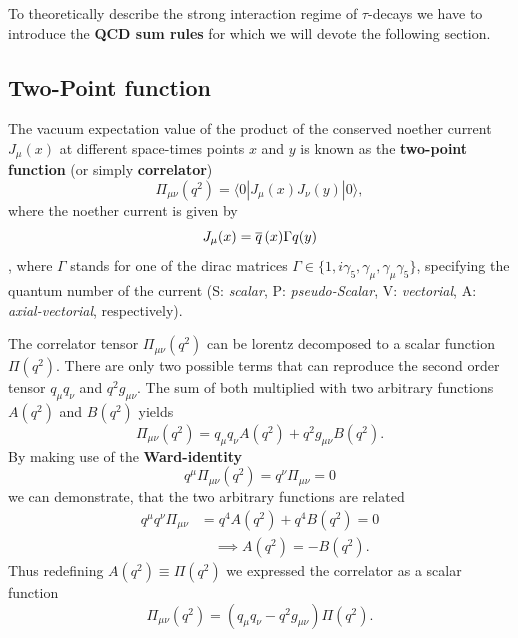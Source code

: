 \documentclass[../../index.tex]{subfiles}
\begin{document}
To theoretically describe the strong interaction regime of $\tau$-decays we have
to introduce the \textbf{QCD sum rules} for which we will devote the following section.

\subsection{Two-Point function}
\label{sec:twoPointFunction}
The vacuum expectation value of the product of the conserved
noether current $J_\mu(x)$ at different space-times points $x$ and $y$ is known
as the \textbf{two-point function} (or simply \textbf{correlator})
\begin{equation}
  \label{eq:twoPointFunction}
  \Pi_{\mu\nu}(q^2) = \langle  0 | J_\mu(x) J_\nu(y) | 0 \rangle,
\end{equation}
where the noether current is given by
\begin{equation}
  J_\mu(x) = \overline{q}\,(x) \Gamma q(y)
\end{equation}
, where $\Gamma$ stands for one of the dirac matrices $\Gamma \in \{ 1,
i\gamma_5, \gamma_\mu, \gamma_\mu\gamma_5\}$, specifying the quantum number of
the current (S: \textit{scalar}, P: \textit{pseudo-Scalar}, V:
\textit{vectorial}, A: \textit{axial-vectorial}, respectively). 

The correlator tensor $\Pi_{\mu\nu}(q^2)$ can be lorentz decomposed to a scalar
function $\Pi(q^2)$. There are only two possible terms that can reproduce the
second order tensor $q_\mu q_\nu$ and $q^2 g_{\mu\nu}$. The sum of both
multiplied with two arbitrary functions $A(q^2)$ and $B(q^2)$ yields
\begin{equation}
  \Pi_{\mu\nu}(q^2) = q_\mu q_\nu A(q^2) + q^2 g_{\mu\nu} B(q^2).
\end{equation}
By making use of the \textbf{Ward-identity} \cite{Peskin1995}
\begin{equation}
  \label{eq:wardIdentity}
  q^\mu \Pi_{\mu\nu}(q^2) = q^\nu \Pi_{\mu\nu} = 0
\end{equation}
we can demonstrate, that the two arbitrary functions are related
\begin{equation}
  \begin{split}
    q^\mu q^\nu \Pi_{\mu\nu} &= q^4 A(q^2) + q^4 B(q^2) = 0 \\
    &\quad \implies A(q^2) = -B(q^2).
  \end{split}
\end{equation}
Thus redefining $A(q^2) \equiv \Pi(q^2)$ we expressed the correlator as a scalar function
\begin{equation}
  \Pi_{\mu\nu}(q^2) = (q_\mu q_\nu - q^2 g_{\mu\nu})\Pi(q^2).
\end{equation}
\end{document}
